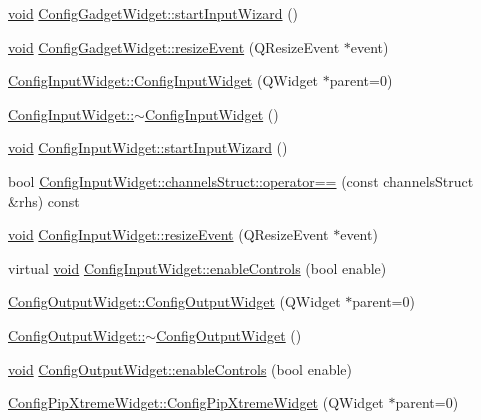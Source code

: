 \begin{DoxyCompactItemize}
\item 
\hyperlink{group___u_a_v_objects_plugin_ga444cf2ff3f0ecbe028adce838d373f5c}{void} \hyperlink{group___config_plugin_ga8655bea31bbed90a46bacb2f428301f6}{\-Config\-Gadget\-Widget\-::start\-Input\-Wizard} ()
\item 
\hyperlink{group___u_a_v_objects_plugin_ga444cf2ff3f0ecbe028adce838d373f5c}{void} \hyperlink{group___config_plugin_ga62d98ed212936a33d9e9240f27aa7497}{\-Config\-Gadget\-Widget\-::resize\-Event} (\-Q\-Resize\-Event $\ast$event)
\item 
\hyperlink{group___config_plugin_ga5453669d3da8b5752b88e14cfca3ba03}{\-Config\-Input\-Widget\-::\-Config\-Input\-Widget} (\-Q\-Widget $\ast$parent=0)
\item 
\hyperlink{group___config_plugin_gaa2ae4d78db5c283094de22747cd958b8}{\-Config\-Input\-Widget\-::$\sim$\-Config\-Input\-Widget} ()
\item 
\hyperlink{group___u_a_v_objects_plugin_ga444cf2ff3f0ecbe028adce838d373f5c}{void} \hyperlink{group___config_plugin_gaad3d50c5993be3628b91188aad094505}{\-Config\-Input\-Widget\-::start\-Input\-Wizard} ()
\item 
bool \hyperlink{group___config_plugin_gaa1b84821bb68ba5f3e6cdc312899f4dd}{\-Config\-Input\-Widget\-::channels\-Struct\-::operator==} (const channels\-Struct \&rhs) const 
\item 
\hyperlink{group___u_a_v_objects_plugin_ga444cf2ff3f0ecbe028adce838d373f5c}{void} \hyperlink{group___config_plugin_ga46ca6ec855581471ed30c902b43371cf}{\-Config\-Input\-Widget\-::resize\-Event} (\-Q\-Resize\-Event $\ast$event)
\item 
virtual \hyperlink{group___u_a_v_objects_plugin_ga444cf2ff3f0ecbe028adce838d373f5c}{void} \hyperlink{group___config_plugin_ga39ced7c878bb56024b9bdd2bdb90d68f}{\-Config\-Input\-Widget\-::enable\-Controls} (bool enable)
\item 
\hyperlink{group___config_plugin_gae97fadc2217af00fbdcd40904dffdfcd}{\-Config\-Output\-Widget\-::\-Config\-Output\-Widget} (\-Q\-Widget $\ast$parent=0)
\item 
\hyperlink{group___config_plugin_ga583ddecf4689ec9d73a39ac36d47beb5}{\-Config\-Output\-Widget\-::$\sim$\-Config\-Output\-Widget} ()
\item 
\hyperlink{group___u_a_v_objects_plugin_ga444cf2ff3f0ecbe028adce838d373f5c}{void} \hyperlink{group___config_plugin_ga8c6d4684111bd4a10d4940a803faf852}{\-Config\-Output\-Widget\-::enable\-Controls} (bool enable)
\item 
\hyperlink{group___config_plugin_ga93976625b77842e32b44100f87cad868}{\-Config\-Pip\-Xtreme\-Widget\-::\-Config\-Pip\-Xtreme\-Widget} (\-Q\-Widget $\ast$parent=0)

\end{DoxyCompactItemize}
